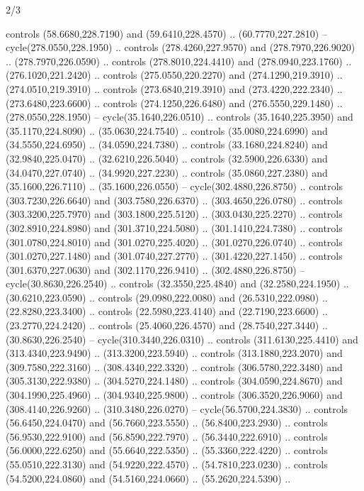 \begin{flagdescription}{2/3}
\begin{scope}[xshift=0.5\flaglength,yshift=0.5\flagwidth,scale=\stretchfactor]
\begin{scope}[scale=0.001645\flagwidth,yshift=65mm,xshift=-63mm]
\begin{scope}[y=0.80pt, x=0.80pt, yscale=-1,]
\begin{scope}[cm={{1.33333,0.0,0.0,1.33333,(0.0,1e-05)}}]
  controls (58.6680,228.7190) and (59.6410,228.4570) .. (60.7770,227.2810) --
  cycle(278.0550,228.1950) .. controls (278.4260,227.9570) and
  (278.7970,226.9020) .. (278.7970,226.0590) .. controls (278.8010,224.4410) and
  (278.0940,223.1760) .. (276.1020,221.2420) .. controls (275.0550,220.2270) and
  (274.1290,219.3910) .. (274.0510,219.3910) .. controls (273.6840,219.3910) and
  (273.4220,222.2340) .. (273.6480,223.6600) .. controls (274.1250,226.6480) and
  (276.5550,229.1480) .. (278.0550,228.1950) -- cycle(35.1640,226.0510) ..
  controls (35.1640,225.3950) and (35.1170,224.8090) .. (35.0630,224.7540) ..
  controls (35.0080,224.6990) and (34.5550,224.6950) .. (34.0590,224.7380) ..
  controls (33.1680,224.8240) and (32.9840,225.0470) .. (32.6210,226.5040) ..
  controls (32.5900,226.6330) and (34.0470,227.0740) .. (34.9920,227.2230) ..
  controls (35.0860,227.2380) and (35.1600,226.7110) .. (35.1600,226.0550) --
  cycle(302.4880,226.8750) .. controls (303.7230,226.6640) and
  (303.7580,226.6370) .. (303.4650,226.0780) .. controls (303.3200,225.7970) and
  (303.1800,225.5120) .. (303.0430,225.2270) .. controls (302.8910,224.8980) and
  (301.3710,224.5080) .. (301.1410,224.7380) .. controls (301.0780,224.8010) and
  (301.0270,225.4020) .. (301.0270,226.0740) .. controls (301.0270,227.1480) and
  (301.0740,227.2770) .. (301.4220,227.1450) .. controls (301.6370,227.0630) and
  (302.1170,226.9410) .. (302.4880,226.8750) -- cycle(30.8630,226.2540) ..
  controls (32.3550,225.4840) and (32.2580,224.1950) .. (30.6210,223.0590) ..
  controls (29.0980,222.0080) and (26.5310,222.0980) .. (22.8280,223.3400) ..
  controls (22.5980,223.4140) and (22.7190,223.6600) .. (23.2770,224.2420) ..
  controls (25.4060,226.4570) and (28.7540,227.3440) .. (30.8630,226.2540) --
  cycle(310.3440,226.0310) .. controls (311.6130,225.4410) and
  (313.4340,223.9490) .. (313.3200,223.5940) .. controls (313.1880,223.2070) and
  (309.7580,222.3160) .. (308.4340,222.3320) .. controls (306.5780,222.3480) and
  (305.3130,222.9380) .. (304.5270,224.1480) .. controls (304.0590,224.8670) and
  (304.1990,225.4960) .. (304.9340,225.9800) .. controls (306.3520,226.9060) and
  (308.4140,226.9260) .. (310.3480,226.0270) -- cycle(56.5700,224.3830) ..
  controls (56.6450,224.0470) and (56.7660,223.5550) .. (56.8400,223.2930) ..
  controls (56.9530,222.9100) and (56.8590,222.7970) .. (56.3440,222.6910) ..
  controls (56.0000,222.6250) and (55.6640,222.5350) .. (55.3360,222.4220) ..
  controls (55.0510,222.3130) and (54.9220,222.4570) .. (54.7810,223.0230) ..
  controls (54.5200,224.0860) and (54.5160,224.0660) .. (55.2620,224.5390) ..

\end{scope}
\end{scope}
\end{scope}
\end{scope}
\end{flagdescription}
